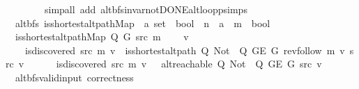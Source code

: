 \begin{isabellebody}
\ \ \ \ \ \ \ \ {\isacharparenleft}{\kern0pt}simp{\isacharunderscore}{\kern0pt}all\ add{\isacharcolon}{\kern0pt}\ alt{\isacharunderscore}{\kern0pt}bfs{\isacharunderscore}{\kern0pt}invar{\isacharunderscore}{\kern0pt}not{\isacharunderscore}{\kern0pt}DONE{\isachardot}{\kern0pt}alt{\isacharunderscore}{\kern0pt}loop{\isacharunderscore}{\kern0pt}psimps{\isacharparenright}{\kern0pt}\isanewline
\ \ \isamarkupfalse%
\isanewline
{}\isamarkupfalse%
%
\endisatagproof
{\isafoldproof}%
%
\isadelimproof
\isanewline
%
\endisadelimproof
\isanewline
{}\isamarkupfalse%
\ {\isacharparenleft}{\kern0pt}\ alt{\isacharunderscore}{\kern0pt}bfs{\isacharparenright}{\kern0pt}\ is{\isacharunderscore}{\kern0pt}shortest{\isacharunderscore}{\kern0pt}alt{\isacharunderscore}{\kern0pt}path{\isacharunderscore}{\kern0pt}Map\ {\isacharcolon}{\kern0pt}{\isacharcolon}{\kern0pt}\ {\isachardoublequoteopen}{\isacharparenleft}{\kern0pt}{\isacharprime}{\kern0pt}a\ set\ {\isasymRightarrow}\ bool{\isacharparenright}{\kern0pt}\ {\isasymRightarrow}\ {\isacharprime}{\kern0pt}n\ {\isasymRightarrow}\ {\isacharprime}{\kern0pt}a\ {\isasymRightarrow}\ {\isacharprime}{\kern0pt}m\ {\isasymRightarrow}\ bool{\isachardoublequoteclose}\ \isanewline
\ \ {\isachardoublequoteopen}is{\isacharunderscore}{\kern0pt}shortest{\isacharunderscore}{\kern0pt}alt{\isacharunderscore}{\kern0pt}path{\isacharunderscore}{\kern0pt}Map\ Q\ G\ src\ m\ {\isasymequiv}\isanewline
\ \ \ {\isasymforall}v{\isachardot}{\kern0pt}\isanewline
\ \ \ \ is{\isacharunderscore}{\kern0pt}discovered\ src\ m\ v\ {\isasymlongrightarrow}\ is{\isacharunderscore}{\kern0pt}shortest{\isacharunderscore}{\kern0pt}alt{\isacharunderscore}{\kern0pt}path\ Q\ {\isacharparenleft}{\kern0pt}Not\ {\isasymcirc}\ Q{\isacharparenright}{\kern0pt}\ {\isacharparenleft}{\kern0pt}G{\isachardot}{\kern0pt}E\ G{\isacharparenright}{\kern0pt}\ {\isacharparenleft}{\kern0pt}rev{\isacharunderscore}{\kern0pt}follow\ m\ v{\isacharparenright}{\kern0pt}\ src\ v\ {\isasymand}\isanewline
\ \ \ \ {\isasymnot}\ is{\isacharunderscore}{\kern0pt}discovered\ src\ m\ v\ {\isasymlongrightarrow}\ {\isasymnot}\ alt{\isacharunderscore}{\kern0pt}reachable\ Q\ {\isacharparenleft}{\kern0pt}Not\ {\isasymcirc}\ Q{\isacharparenright}{\kern0pt}\ {\isacharparenleft}{\kern0pt}G{\isachardot}{\kern0pt}E\ G{\isacharparenright}{\kern0pt}\ src\ v{\isachardoublequoteclose}\isanewline
\isanewline
{}\isamarkupfalse%
\ {\isacharparenleft}{\kern0pt}\ alt{\isacharunderscore}{\kern0pt}bfs{\isacharunderscore}{\kern0pt}valid{\isacharunderscore}{\kern0pt}input{\isacharparenright}{\kern0pt}\ correctness{\isacharcolon}{\kern0pt}\isanewline

\end{isabellebody}
